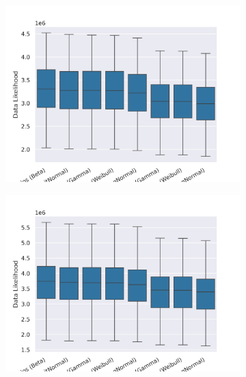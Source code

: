 \documentclass[10pt,letterpaper]{article}
\begin{document}
\begin{figure}[h!]
	\caption{The log data likelihoods for the different distributions and datasets. (The higher the better.)}
	
	\centering
	\begin{subfigure}[b]{0.45\textwidth}
		\centering
		\includegraphics[width=\textwidth]{figures/yule-100-ccd1-likelihood.png}
	\end{subfigure}
	\begin{subfigure}[b]{0.45\textwidth}
		\centering
		\includegraphics[width=\textwidth]{figures/yule-200-ccd1-likelihood.png}
	\end{subfigure}
	

\end{figure}
\end{document}
